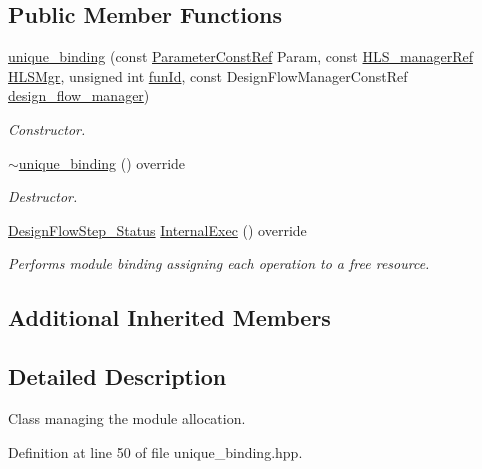 \subsection*{Public Member Functions}
\begin{DoxyCompactItemize}
\item 
\hyperlink{classunique__binding_ad92c3d681deec507f2a2da257b39a496}{unique\+\_\+binding} (const \hyperlink{Parameter_8hpp_a37841774a6fcb479b597fdf8955eb4ea}{Parameter\+Const\+Ref} Param, const \hyperlink{hls__manager_8hpp_acd3842b8589fe52c08fc0b2fcc813bfe}{H\+L\+S\+\_\+manager\+Ref} \hyperlink{classHLS__step_ade85003a99d34134418451ddc46a18e9}{H\+L\+S\+Mgr}, unsigned int \hyperlink{classHLSFunctionStep_a3e6434fd86c698b0c70520b859bff5b0}{fun\+Id}, const Design\+Flow\+Manager\+Const\+Ref \hyperlink{classDesignFlowStep_ab770677ddf087613add30024e16a5554}{design\+\_\+flow\+\_\+manager})
\begin{DoxyCompactList}\small\item\em Constructor. \end{DoxyCompactList}\item 
\hyperlink{classunique__binding_a3fa8502710094f30f0770e5843b9bb25}{$\sim$unique\+\_\+binding} () override
\begin{DoxyCompactList}\small\item\em Destructor. \end{DoxyCompactList}\item 
\hyperlink{design__flow__step_8hpp_afb1f0d73069c26076b8d31dbc8ebecdf}{Design\+Flow\+Step\+\_\+\+Status} \hyperlink{classunique__binding_a7d59ec7a2432423cb1e29fe246f73032}{Internal\+Exec} () override
\begin{DoxyCompactList}\small\item\em Performs module binding assigning each operation to a free resource. \end{DoxyCompactList}\end{DoxyCompactItemize}
\subsection*{Additional Inherited Members}


\subsection{Detailed Description}
Class managing the module allocation. 

Definition at line 50 of file unique\+\_\+binding.\+hpp.



